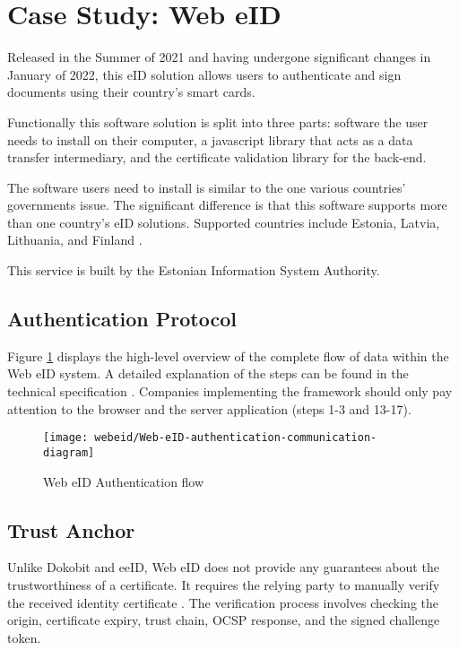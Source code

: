 \section{Case Study: Web eID}

Released in the Summer of 2021 \cite{ria-webeid} and having undergone significant changes in January of 2022, this eID solution allows users to authenticate and sign documents using their country's smart cards.

Functionally this software solution is split into three parts: software the user needs to install on their computer, a javascript library that acts as a data transfer intermediary, and the certificate validation library for the back-end.

The software users need to install is similar to the one various countries' governments issue. The significant difference is that this software supports more than one country's eID solutions. Supported countries include Estonia, Latvia, Lithuania, and Finland \cite{ria-webeid}.

This service is built by the Estonian Information System Authority.

\subsection{Authentication Protocol}

Figure \ref{fig:web-eid-authentication} displays the high-level overview of the complete flow of data within the Web eID system. A detailed explanation of the steps can be found in the technical specification \cite{ria-webeid-systemarchitecture}. Companies implementing the framework should only pay attention to the browser and the server application (steps 1-3 and 13-17).

\begin{figure}
  \centering
  \texttt{[image: webeid/Web-eID-authentication-communication-diagram]}
  \caption{Web eID Authentication flow \cite{ria-webeid-systemarchitecture}}
  \label{fig:web-eid-authentication}
\end{figure}

\subsection{Trust Anchor}

Unlike Dokobit and eeID, Web eID does not provide any guarantees about the trustworthiness of a certificate. It requires the relying party to manually verify the received identity certificate \cite{ria-webeid-source-web-eid-authtoken-validation-java-readme}. The verification process involves checking the origin, certificate expiry, trust chain, OCSP response, and the signed challenge token.

